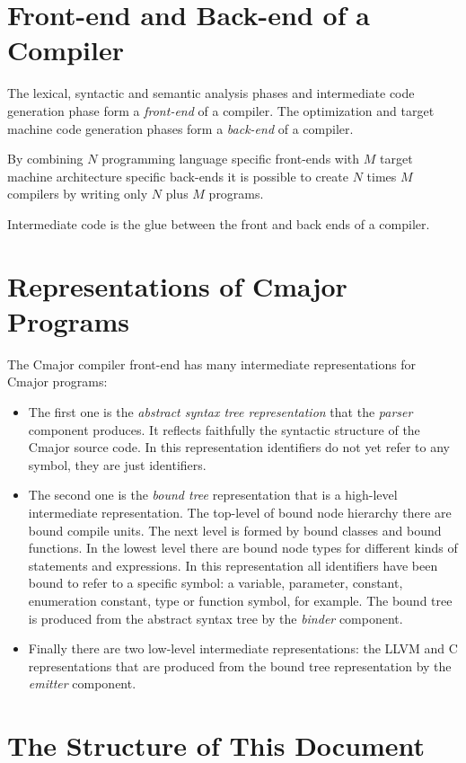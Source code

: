\documentclass[a4paper,oneside,11pt]{book}
\theoremstyle{definition}
\begin{document}
\section{Front-end and Back-end of a Compiler}

The lexical, syntactic and semantic analysis phases and intermediate code generation phase
form a \emph{front-end} of a compiler. The optimization and target machine code generation phases
form a \emph{back-end} of a compiler.

By combining $N$ programming language specific front-ends with $M$ target machine architecture specific back-ends
it is possible to create $N$ times $M$ compilers by writing only $N$ plus $M$ programs.

Intermediate code is the glue between the front and back ends of a compiler.

\section{Representations of Cmajor Programs}\label{representations}

The Cmajor compiler front-end has many intermediate representations for Cmajor programs:
\begin{itemize}
\item
The first one is the \emph{abstract syntax tree representation} that the \emph{parser} component produces.
It reflects faithfully the syntactic structure of the Cmajor source code.
In  this representation identifiers do not yet refer to any symbol, they are just identifiers.
\item
The second one is the \emph{bound tree} representation that is a high-level intermediate representation.
The top-level of bound node hierarchy there are bound compile units.
The next level is formed by bound classes and bound functions. In the lowest level there are bound node types for different kinds of statements and expressions.
In this representation all identifiers have been bound to refer to a specific symbol:
a variable, parameter, constant, enumeration constant, type or function symbol, for example.
The bound tree is produced from the abstract syntax tree by the \emph{binder} component.
\item
Finally there are two low-level intermediate representations: the LLVM and C representations that are produced from the bound tree representation by
the \emph{emitter} component.
\end{itemize}

\section{The Structure of This Document}
\end{document}
